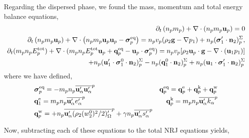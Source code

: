 Regarding the dispersed phase, we found the mass, momentum and total energy balance equations, 
\begin{align*}
    \partial_t \left(n_p m_p\right)
    + \mathbf{\nabla}\cdot \left(n_pm_p\textbf{u}_p
    \right)
    = 
    0\\
    \partial_t \left(n_p m_p \textbf{u}_p\right)
    + \mathbf{\nabla}\cdot \left(n_p
    m_p \textbf{u}_p \textbf{u}_p 
    - \bm{\sigma}_p^\text{eq}
    \right)
    = 
    n_p v_p  (  
    \rho_2 \textbf{g}
    - \mathbf{\nabla} p_1)
    + n_p (\bm{\sigma}_1'\cdot \textbf{n}_2)_p^\Sigma,\\
    \partial_t(m_p n_pE_p^\text{tot})
    + \mathbf{\nabla}\cdot(m_pn_p E_p^\text{tot} \textbf{u}_p 
    + \textbf{q}_p^\text{eq} - \textbf{u}_p \cdot \bm{\sigma}_p^\text{eq})
    =  n_p v_p [\rho_2 \textbf{u}_p\cdot  \textbf{g} 
    - \mathbf{\nabla}\cdot (\textbf{u}_1 p_1)]\\
    +  n_p ( \textbf{u}'_1 \cdot \bm{\sigma}_1^0 \cdot \textbf{n}_2)_p^\Sigma
    -  n_p (\textbf{q}_1^0 \cdot \textbf{n}_2)_p^\Sigma
    +  n_p (\textbf{u}_1 \cdot \bm{\sigma}_1'\cdot \textbf{n}_2)_p^\Sigma
\end{align*}
where we have defined, 
\begin{align*}
    &\bm{\sigma}_p^\text{eq}
    = -  m_pn_p\overline{\textbf{u}_\alpha'\textbf{u}_\alpha'}^{p}
    &\textbf{q}_p^\text{eq}
    =\textbf{q}_p^\text{e} 
    +\textbf{q}_p^\text{k}  
    +\textbf{q}_p^\text{w}  
    \\
    &\textbf{q}_1^\text{e}
    = m_p n_p\overline{\textbf{u}_\alpha' e_\alpha'}^{p} 
    &\textbf{q}_p^\text{k}
    = m_p n_p\overline{\textbf{u}_\alpha' k_\alpha}^{p} 
    \\
    &\textbf{q}_p^\text{w}
    = 
    + n_p\overline{\textbf{u}_\alpha'(\rho_2 (w^0_2)^2/2 )'_\Omega}^{p}
    + \gamma n_p\overline{\textbf{u}_\alpha' s_\alpha'}^{p}
\end{align*}

Now, subtracting each of these equations to the total NRJ equations yields, 


